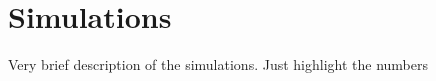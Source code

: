\section{Simulations} \label{sec:sims} 
Very brief description of the simulations. Just highlight the numbers
